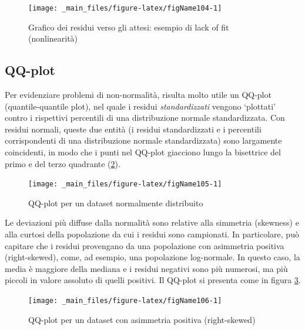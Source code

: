 \documentclass[a4paper,12pt,oneside]{book}
\begin{document}
\begin{figure}

{\centering \texttt{[image: \_main\_files/figure-latex/figName104-1]} 

}

\caption{Grafico dei residui verso gli attesi: esempio di lack of fit (nonlinearità)}\label{fig:figName104}
\end{figure}

\hypertarget{qq-plot}{%
\subsection{QQ-plot}\label{qq-plot}}

Per evidenziare problemi di non-normalità, risulta molto utile un QQ-plot (quantile-quantile plot), nel quale i residui \emph{standardizzati} vengono `plottati' contro i rispettivi percentili di una distribuzione normale standardizzata. Con residui normali, queste due entità (i residui standardizzati e i percentili corrispondenti di una distribuzione normale standardizzata) sono largamente coincidenti, in modo che i punti nel QQ-plot giacciono lungo la bisettrice del primo e del terzo quadrante (\ref{fig:figName105}).

\begin{figure}

{\centering \texttt{[image: \_main\_files/figure-latex/figName105-1]} 

}

\caption{QQ-plot per un dataset normalmente distribuito}\label{fig:figName105}
\end{figure}

Le deviazioni più diffuse dalla normalità sono relative alla simmetria (skewness) e alla curtosi della popolazione da cui i residui sono campionati. In particolare, può capitare che i residui provengano da una popolazione con asimmetria positiva (right-skewed), come, ad esempio, una popolazione log-normale. In questo caso, la media è maggiore della mediana e i residui negativi sono più numerosi, ma più piccoli in valore assoluto di quelli positivi. Il QQ-plot si presenta come in figura \ref{fig:figName106}.

\begin{figure}

{\centering \texttt{[image: \_main\_files/figure-latex/figName106-1]} 

}

\caption{QQ-plot per un dataset con asimmetria positiva (right-skewed)}\label{fig:figName106}
\end{figure}
\end{document}
